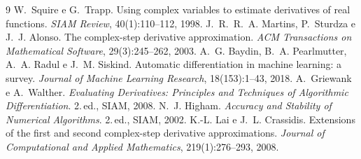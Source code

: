 \documentclass[11pt,a4paper]{article}
\begin{document}
\begin{thebibliography}{9}
 W.~Squire e G.~Trapp. Using complex variables to estimate derivatives of real functions. \emph{SIAM Review}, 40(1):110--112, 1998.
 J.~R.~R.~A. Martins, P.~Sturdza e J.~J. Alonso. The complex-step derivative approximation. \emph{ACM Transactions on Mathematical Software}, 29(3):245--262, 2003.
 A.~G. Baydin, B.~A. Pearlmutter, A.~A. Radul e J.~M. Siskind. Automatic differentiation in machine learning: a survey. \emph{Journal of Machine Learning Research}, 18(153):1--43, 2018.
 A.~Griewank e A.~Walther. \emph{Evaluating Derivatives: Principles and Techniques of Algorithmic Differentiation}. 2.\,ed., SIAM, 2008.
 N.~J. Higham. \emph{Accuracy and Stability of Numerical Algorithms}. 2.\,ed., SIAM, 2002.
 K.-L. Lai e J.~L. Crassidis. Extensions of the first and second complex-step derivative approximations. \emph{Journal of Computational and Applied Mathematics}, 219(1):276--293, 2008.
\end{thebibliography}
\end{document}

